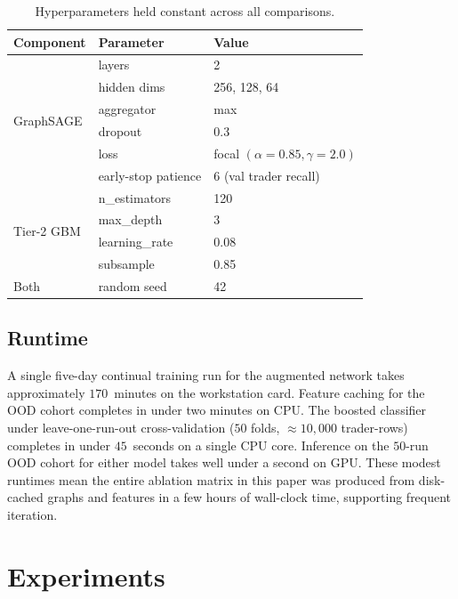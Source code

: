 \documentclass[10pt,twocolumn,letterpaper]{article}
\begin{document}
\begin{table}[t]
\caption{Hyperparameters held constant across all comparisons.}
\label{tab:hparams}
\centering
\footnotesize
\begin{tabular}{lll}
\toprule
Component & Parameter & Value \\
\midrule
\multirow{6}{*}{GraphSAGE} & layers & 2 \\
 & hidden dims & 256, 128, 64 \\
 & aggregator & max \\
 & dropout & 0.3 \\
 & loss & focal $(\alpha{=}0.85,\gamma{=}2.0)$ \\
 & early-stop patience & 6 (val trader recall) \\
\midrule
\multirow{4}{*}{Tier-2 GBM} & n\_estimators & 120 \\
 & max\_depth & 3 \\
 & learning\_rate & 0.08 \\
 & subsample & 0.85 \\
\midrule
Both & random seed & 42 \\
\bottomrule
\end{tabular}
\end{table}

\subsection{Runtime}
A single five-day continual training run for the augmented network
takes approximately \(170\)~minutes on the workstation card. Feature
caching for the OOD cohort completes in under two minutes on CPU. The
boosted classifier under leave-one-run-out cross-validation
(\(50\) folds, \(\approx\!10{,}000\) trader-rows) completes in under
\(45\)~seconds on a single CPU core. Inference on the \(50\)-run OOD
cohort for either model takes well under a second on GPU. These
modest runtimes mean the entire ablation matrix in this paper was
produced from disk-cached graphs and features in a few hours of
wall-clock time, supporting frequent iteration.

\section{Experiments}
\label{sec:results}
\end{document}
